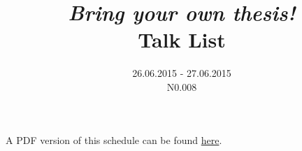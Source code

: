 \documentclass[12pt, a4paper, english]{article}
\title{\emph{Bring your own thesis!} \\ Talk List}
\date{26.06.2015 - 27.06.2015 \\ N0.008}
\begin{document}
\maketitle

A PDF version of this schedule can be found \href{schedule.pdf}{here}.


\end{document}
